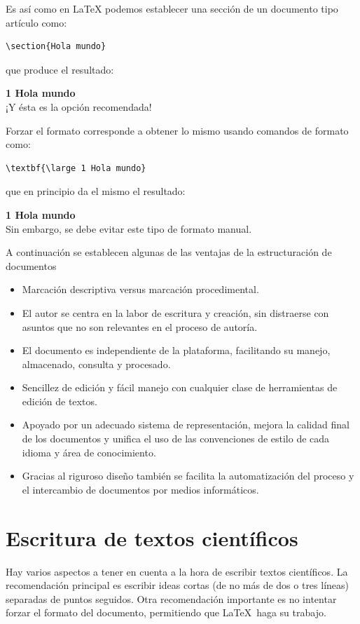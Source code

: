 \documentclass{article}
\begin{document}
Es así como en \LaTeX{} podemos establecer una sección de un documento tipo artículo como:
\begin{lstlisting}
\section{Hola mundo}
\end{lstlisting}
que produce el resultado:

\noindent \textbf{\large 1 Hola mundo}\\
¡Y ésta es la opción recomendada!     

Forzar el formato corresponde a obtener lo mismo usando comandos de formato como:
\begin{lstlisting}
\textbf{\large 1 Hola mundo}
\end{lstlisting}
que en principio da el mismo el resultado:

\noindent \textbf{\large 1 Hola mundo}\\
Sin embargo, se debe evitar este tipo de formato manual.

A continuación se establecen algunas de las ventajas de la estructuración de documentos
  \begin{itemize}
  \item   Marcación descriptiva versus marcación procedimental.
  \item   El autor se centra en la labor de escritura y creación, sin distraerse con asuntos que no son relevantes en el proceso de autoría.
  \item  El documento es independiente de la plataforma, facilitando su manejo, almacenado, consulta y procesado.
  \item   Sencillez de edición y fácil manejo con cualquier clase de herramientas de edición de textos.
  \item   Apoyado por un adecuado sistema de representación, mejora la calidad final de los documentos y unifica el uso de las convenciones de estilo de cada idioma y área de conocimiento.
  \item   Gracias al riguroso diseño también se facilita la automatización del proceso y el intercambio de documentos por medios informáticos. 
  \end{itemize}
  
\section{Escritura de textos científicos}  
Hay varios aspectos a tener en cuenta a la hora de escribir textos científicos. La recomendación principal es escribir ideas cortas (de no más de dos o tres líneas) separadas de puntos seguidos. Otra recomendación importante es no intentar forzar el formato del documento, permitiendo que \LaTeX\ haga su trabajo.
\end{document}
